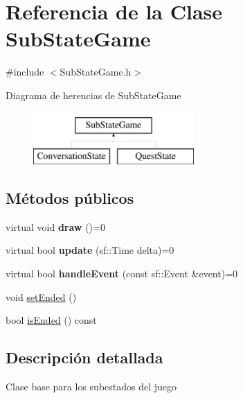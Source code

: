 \hypertarget{classSubStateGame}{}\section{Referencia de la Clase Sub\+State\+Game}
\label{classSubStateGame}


{\ttfamily \#include $<$Sub\+State\+Game.\+h$>$}

Diagrama de herencias de Sub\+State\+Game\begin{figure}[H]
\begin{center}
\leavevmode
\includegraphics[height=2.000000cm]{classSubStateGame}
\end{center}
\end{figure}
\subsection*{Métodos públicos}
\begin{DoxyCompactItemize}
\item 
\hypertarget{classSubStateGame_a63176b9e97fa67b25609bed1c1810e95}{}virtual void {\bfseries draw} ()=0\label{classSubStateGame_a63176b9e97fa67b25609bed1c1810e95}

\item 
\hypertarget{classSubStateGame_af8e401cd2b5032e2d677eaac6bff3253}{}virtual bool {\bfseries update} (sf\+::\+Time delta)=0\label{classSubStateGame_af8e401cd2b5032e2d677eaac6bff3253}

\item 
\hypertarget{classSubStateGame_af4ebe86d83d064a02049160915c4ac97}{}virtual bool {\bfseries handle\+Event} (const sf\+::\+Event \&event)=0\label{classSubStateGame_af4ebe86d83d064a02049160915c4ac97}

\item 
void \hyperlink{classSubStateGame_ad50890e351e9ca02fec294bd3139e887}{set\+Ended} ()
\item 
bool \hyperlink{classSubStateGame_ac5bf0c28ce1a5f2de71246dd4dc4fc0e}{is\+Ended} () const 
\end{DoxyCompactItemize}


\subsection{Descripción detallada}
Clase base para los subestados del juego 

